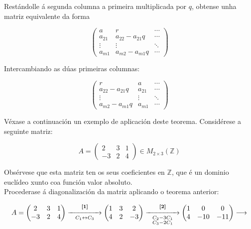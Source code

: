 \documentclass[twoside]{report}
\theoremstyle{mystyle}
\begin{document}
\noindent Restándolle á segunda columna a primeira multiplicada por $q$, obtense unha matriz equivalente da forma

$$
\begin{pmatrix}
a & r & \cdots \\
a_{21} & a_{22} - a_{21}q & \cdots \\
\vdots & \vdots & \ddots\\
a_{m1} & a_{m2} - a_{m1}q & \cdots
\end{pmatrix}
$$

\vspace{5mm}

\noindent Intercambiando as dúas primeiras columnas:

$$
\begin{pmatrix}
r & a & \cdots\\
a_{22} - a_{21}q & a_{21} & \cdots\\
\vdots & \vdots & \ddots \\
a_{m2}- a_{m1}q & a_{m1} & \cdots 
\end{pmatrix}
$$

\vspace{5mm}

\noindent Véxase a continuación un exemplo de aplicación deste teorema. Considérese a seguinte matriz:

$$
A = \begin{pmatrix}
2 & 3 & 1 \\
-3 & 2 & 4
\end{pmatrix}
\in M_{2 \times 3}(\mathbb{Z})
$$

\noindent Obsérvese que esta matriz ten os seus coeficientes en $\mathbb{Z}$, que é un dominio euclídeo xunto coa función valor absoluto.\\

\noindent Procederase á diagonalización da matriz aplicando o teorema anterior:

$$
A = \begin{pmatrix}
2 & 3 & 1 \\
-3 & 2 & 4
\end{pmatrix}
\overset{\textbf{[1]}}{\underset{C_{1} \leftrightarrow C_{3}}{\xrightarrow{\hspace{15mm}}}}
\begin{pmatrix}
1 & 3 & 2 \\
4 & 2 & -3
\end{pmatrix}
\overset{\textbf{[2]}}{\underset{\substack{C_{2} - 3C_{1} \\ C_{3} - 2C_{1}}}{\xrightarrow{\hspace{15mm}}}}
\begin{pmatrix}
1 & 0 & 0 \\
4 & -10 & -11
\end{pmatrix}
\longrightarrow
$$
\end{document}
